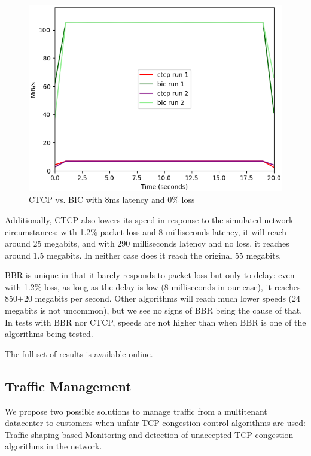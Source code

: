 \documentclass{article}
\begin{document}
\begin{figure}[H]
	\centering
		\includegraphics[scale=0.4]{figs/ctcp-bic-8-0.png}
		\caption{CTCP vs. BIC with 8ms latency and 0\% loss}
	\label{fig:ctcp-1}
\end{figure}

Additionally, CTCP also lowers its speed in response to the simulated network
circumstances: with 1.2\% packet loss and 8 milliseconds latency, it will reach
around 25 megabits, and with 290 milliseconds latency and no loss, it reaches
around 1.5 megabits. In neither case does it reach the original 55 megabits.

BBR is unique in that it barely responds to packet loss but only to delay: even
with 1.2\% loss, as long as the delay is low (8 milliseconds in our case), it
reaches 850$\pm$20 megabits per second. Other algorithms will reach much lower
speeds (24 megabits is not uncommon), but we see no signs of BBR being the
cause of that. In tests with BBR nor CTCP, speeds are not higher than when BBR
is one of the algorithms being tested.

The full set of results is available online\cite{git-lsproj}.


\subsection{Traffic Management}
We propose two possible solutions to manage traffic from a multitenant datacenter to customers when unfair TCP congestion control algorithms are used: Traffic shaping based Monitoring and detection of unaccepted TCP congestion algorithms in the network. 
\end{document}
